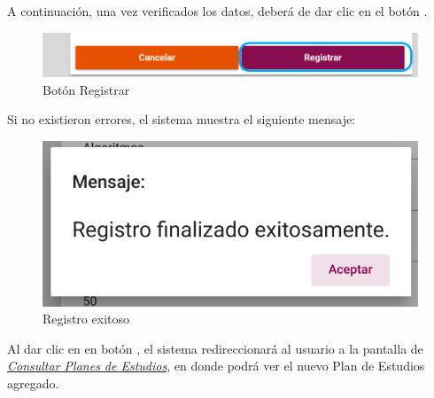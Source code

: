 A continuación, una vez verificados los datos, deberá de dar clic en el botón .
\begin{figure}[!hbtp]
	\centering
	\hypertarget{btnreg}{\includegraphics[width=0.7\linewidth]{images/SP4-GPE/registrarB}}
	\caption{Botón Registrar}
	\label{btnreg}
\end{figure}

Si no existieron errores, el sistema muestra el siguiente mensaje:
	\begin{figure}[!hbtp]
	\centering
	\hypertarget{exito}{\includegraphics[width=0.7\linewidth]{images/SP4-GPE/exito}}
	\caption{Registro exitoso}
	\label{exito}
\end{figure}

Al dar clic en en botón , el sistema redireccionará al usuario a la pantalla de \hyperlink{consultarPE}{\textit{Consultar Planes de Estudios}}, en donde podrá ver el nuevo Plan de Estudios agregado.\\
\newpage

